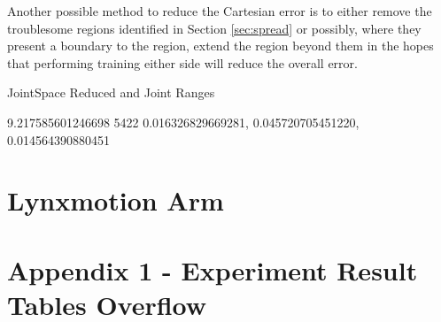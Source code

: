 \documentclass[11.5pt, twoside, a4paper]{article}
\begin{document}
Another possible method to reduce the Cartesian error is to either remove the troublesome regions identified in Section \ref{sec:spread} or possibly, where they present a boundary to the region, extend the region beyond them in the hopes that performing training either side will reduce the overall error. %

JointSpace Reduced and Joint Ranges


9.217585601246698 5422 0.016326829669281, 0.045720705451220, 0.014564390880451

\section{Lynxmotion Arm}









\section{Appendix 1 - Experiment Result Tables Overflow}
\end{document}
